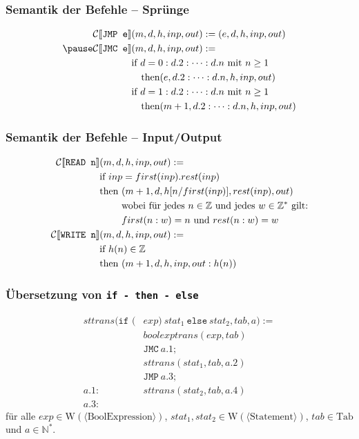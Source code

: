 \documentclass{beamer}
\begin{document}
\begin{frame} \frametitle{Semantik der Befehle -- Sprünge}
	\begin{align*}
		\mathcal{C} [\![ \texttt{JMP e} ]\!] &(m,d,h,inp,out) \defeq (e, d, h, inp, out) \\ \pause
		\mathcal{C} [\![ \texttt{JMC e} ]\!] &(m,d,h,inp,out) \defeq  \\
		&\text{if } d = 0 : d.2 : \dots : d.n \text{ mit } n \ge 1 \\
		&\quad\text{then} (e, d.2 : \dots : d.n, h, inp, out) \\
		&\text{if } d = 1 : d.2 : \dots : d.n \text{ mit } n \ge 1 \\
		&\quad\text{then} (m+1, d.2 : \dots : d.n, h, inp, out) 
	\end{align*}
\end{frame}

\begin{frame} \frametitle{Semantik der Befehle -- Input/Output}
	\begin{align*}
		\mathcal{C} [\![ \texttt{READ n} ]\!] &(m,d,h,inp,out) \defeq  \\
		&\text{if } inp = first(inp).rest(inp) \\
		&\text{then } (m+1, d, h[n/first(inp)], rest(inp), out) \\
		&\phantom{\text{then }} \text{wobei für jedes } n \in \Z \text{ und jedes } w \in \Z^\ast \text{ gilt:} \\
		&\phantom{\text{then }} first(n:w) = n \text{ und } rest(n:w) = w \\
		\mathcal{C} [\![ \texttt{WRITE n} ]\!] &(m,d,h,inp,out) \defeq  \\
		&\text{if } h(n) \in \Z \\
		&\text{then } (m+1, d, h, inp, out : h(n))
	\end{align*}
\end{frame}

\begin{frame} \frametitle{Übersetzung von \texttt{if - then - else}}
	\small \centering
	\begin{align*}
	sttrans( \texttt{if (} &exp \texttt{)} \ stat_1 \ \texttt{else} \ stat_2, tab, a) := \\
	& boolexptrans(exp, tab) \\
	&\texttt{JMC} \ a.1 ; \\
	& sttrans(stat_1, tab, a.2) \\
	&\texttt{JMP} \ a.3; \\
	a.1: \quad & sttrans(stat_2, tab, a.4) \\
	a.3: \quad & \phantom{.}
	\end{align*}
	für alle $exp \in \mathrm{W}(\langle \mathrm{BoolExpression} \rangle )$, $stat_1, stat_2 \in \mathrm{W}(\langle \mathrm{Statement} \rangle )$, $tab \in \mathrm{Tab}$ und $a \in \mathbb{N}^\ast$.
\end{frame}
\end{document}
